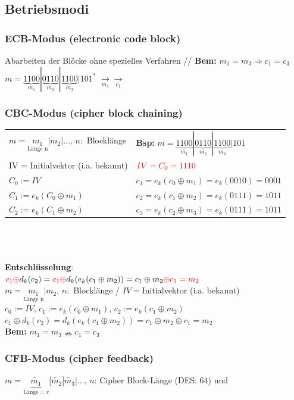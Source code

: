 \documentclass[landscape,twocolumn,a4paper]{article}
\newcommand{\Bold}[1]{\textbf{#1}} %
\newcommand{\T}[1]{\text{#1}} %
\newcommand{\Ra}{\Rightarrow}
\newcommand{\Unten}[2]{\underset{#1}{#2}} %
\begin{document}
\subsection{Betriebsmodi}
\subsubsection{ECB-Modus (electronic code block)}
Abarbeiten der Blöcke ohne spezielles Verfahren {\color{gray} // \Bold{Bem:} $m_1=m_3\Ra c_1=c_3$} \\
 $m=\underbrace{1100}_{m_1}|\underbrace{0110}_{m_2}|\underbrace{1100}_{m_3}|101^*$ $\Unten{m_1}{\longrightarrow}$$\Unten{c_1}{\longrightarrow}$ 
\subsubsection{CBC-Modus (cipher block chaining)}
\begin{tabular}{p{7.5cm}  l}
	$m=\Unten{\T{Länge n}}{m_1}|m_2|\dots$, $n:$ Blocklänge &\Bold{Bsp:} $m=\underbrace{1100}_{m_1} | \underbrace{0110}_{m_2} | \underbrace{1100}_{m_3} | 101$ \\
	{\color{red}IV = Initialvektor} (i.a. bekannt) &  $\color{red}IV=C_0=1110$  \\
	$C_0 := IV$ & $c_1 = e_k(c_0 \oplus m_1) = e_k(0010) = 0001$ \\
	$C_1 := e_k(C_0 \oplus m_1)$ & $c_2 = e_k(c_1 \oplus m_2) = e_k(0111) = 1011$ \\
	$C_2 := e_k(C_1 \oplus m_2)$  & $c_3 = e_k(c_2 \oplus m_3) = e_k(0111) = 1011$ \\
\end{tabular} \\ \\ \\
 \textbf{Entschlüsselung}:  \\
 ${\color{red}c_1\oplus} d_k(c_2)={\color{red}c_1\oplus}d_k(e_k(c_1\oplus m_2))= c_1\oplus m_2 {\color{red}\oplus c_1 = m_2}$ \\
 $m=\Unten{\T{Länge n}}{m_1}|m_2$, $n:$ Blocklänge / $IV=$Initialvektor (i.a. bekannt)\\
 $c_0:=IV$, $c_1:=e_k(c_0\oplus m_1)$, $c_2:=e_k(c_1\oplus m_2)$\\
 $c_1\oplus d_k(c_2)=d_k(e_k(c_1\oplus m_2))=c_1\oplus m_2\oplus c_1=m_2$ \\
 \Bold{Bem:} $m_1=m_3\nRightarrow c_1=c_3$
 
\subsubsection{CFB-Modus (cipher feedback)}
 $m=\underbrace{\tilde{m_1}}_{\T{Länge}=r}|\tilde{m_2}|\tilde{m_3}|\dots$, $n$: Cipher Block-Länge (DES: 64) und 
\end{document}
